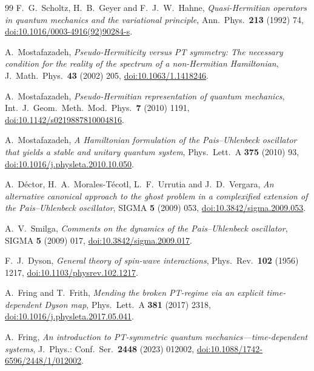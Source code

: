 \documentclass[11pt]{article}
\theoremstyle{definition}
\theoremstyle{remark}
\begin{document}
\begin{thebibliography}{99}
F.~G.~Scholtz, H.~B.~Geyer and F.~J.~W.~Hahne,
\emph{Quasi-Hermitian operators in quantum mechanics and the variational
principle},
Ann.\ Phys.\ \textbf{213} (1992) 74,
\href{https://doi.org/10.1016/0003-4916(92)90284-s}{doi:10.1016/0003-4916(92)90284-s}.

A.~Mostafazadeh,
\emph{Pseudo-Hermiticity versus PT symmetry: The necessary condition for the
reality of the spectrum of a non-Hermitian Hamiltonian},
J.\ Math.\ Phys.\ \textbf{43} (2002) 205,
\href{https://doi.org/10.1063/1.1418246}{doi:10.1063/1.1418246}.

A.~Mostafazadeh,
\emph{Pseudo-Hermitian representation of quantum mechanics},
Int.\ J.\ Geom.\ Meth.\ Mod.\ Phys.\ \textbf{7} (2010) 1191,
\href{https://doi.org/10.1142/s0219887810004816}{doi:10.1142/s0219887810004816}.

A.~Mostafazadeh,
\emph{A Hamiltonian formulation of the Pais--Uhlenbeck oscillator that yields
a stable and unitary quantum system},
Phys.\ Lett.\ A \textbf{375} (2010) 93,
\href{https://doi.org/10.1016/j.physleta.2010.10.050}{doi:10.1016/j.physleta.2010.10.050}.

A.~D\'ector, H.~A.~Morales-T\'ecotl, L.~F.~Urrutia and J.~D.~Vergara,
\emph{An alternative canonical approach to the ghost problem in a complexified
extension of the Pais--Uhlenbeck oscillator},
SIGMA \textbf{5} (2009) 053,
\href{https://doi.org/10.3842/sigma.2009.053}{doi:10.3842/sigma.2009.053}.

A.~V.~Smilga,
\emph{Comments on the dynamics of the Pais--Uhlenbeck oscillator},
SIGMA \textbf{5} (2009) 017,
\href{https://doi.org/10.3842/sigma.2009.017}{doi:10.3842/sigma.2009.017}.

F.~J.~Dyson,
\emph{General theory of spin-wave interactions},
Phys.\ Rev.\ \textbf{102} (1956) 1217,
\href{https://doi.org/10.1103/physrev.102.1217}{doi:10.1103/physrev.102.1217}.

A.~Fring and T.~Frith,
\emph{Mending the broken PT-regime via an explicit time-dependent Dyson map},
Phys.\ Lett.\ A \textbf{381} (2017) 2318,
\href{https://doi.org/10.1016/j.physleta.2017.05.041}{doi:10.1016/j.physleta.2017.05.041}.

A.~Fring,
\emph{An introduction to PT-symmetric quantum mechanics---time-dependent
systems},
J.\ Phys.: Conf.\ Ser.\ \textbf{2448} (2023) 012002,
\href{https://doi.org/10.1088/1742-6596/2448/1/012002}{doi:10.1088/1742-6596/2448/1/012002}.


\end{thebibliography}
\end{document}
